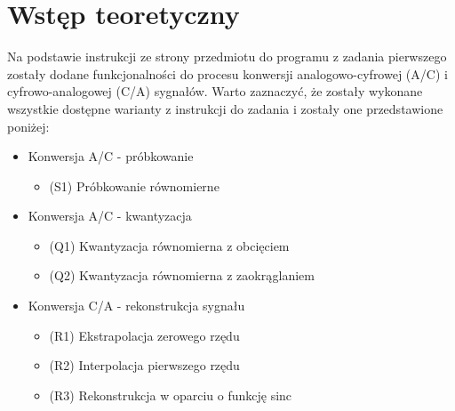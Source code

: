 \documentclass[12pt]{article}
\begin{document}
    \section{Wstęp teoretyczny} {
        Na podstawie instrukcji ze strony przedmiotu do programu z zadania
        pierwszego zostały dodane funkcjonalności do procesu konwersji analogowo-cyfrowej (A/C)
        i cyfrowo-analogowej (C/A) sygnałów. Warto zaznaczyć, że zostały wykonane wszystkie
        dostępne warianty z instrukcji do zadania i zostały one przedstawione poniżej:

        \begin{itemize}
            \item {Konwersja A/C - próbkowanie}
            \begin{itemize}
                \item (S1) Próbkowanie równomierne
            \end{itemize}

            \item {Konwersja A/C - kwantyzacja}
            \begin{itemize}
                \item (Q1) Kwantyzacja równomierna z obcięciem
                \item (Q2) Kwantyzacja równomierna z zaokrąglaniem
            \end{itemize}

            \item {Konwersja C/A - rekonstrukcja sygnału}
            \begin{itemize}
                \item (R1) Ekstrapolacja zerowego rzędu
                \item (R2) Interpolacja pierwszego rzędu
                \item (R3) Rekonstrukcja w oparciu o funkcję sinc
            \end{itemize}
        \end{itemize}

}
\end{document}
